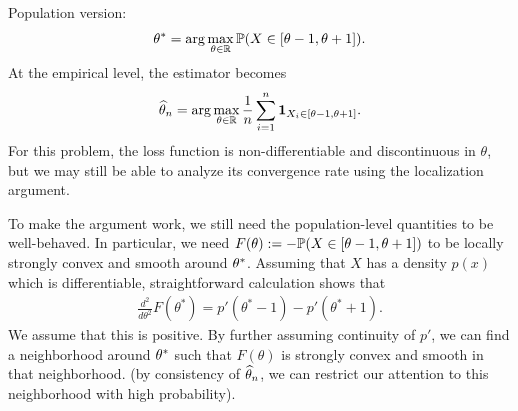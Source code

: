 \documentclass[11pt,letterpaper]{article}
\numberwithin{theorem}{lecture}
\numberwithin{proposition}{lecture}
\numberwithin{lemma}{lecture}
\numberwithin{claim}{lecture}
\numberwithin{corollary}{lecture}
\numberwithin{definition}{lecture}
\numberwithin{conjecture}{lecture}
\numberwithin{remark}{lecture}
\numberwithin{example}{lecture}
\numberwithin{equation}{lecture}
\begin{document}
Population version:
\begin{align*}
  {\theta^*} = \arg\max_{\theta \in \mathbb{R}} {\mathbb{P}} (X \in [\theta - 1, \theta + 1]).
\end{align*}
At the empirical level, the estimator becomes
\begin{align*}
  \widehat{\theta}_n = \arg\max_{\theta \in \mathbb{R}} \frac{1}{n} \sum_{i = 1}^n \bm{1}_{X_i \in [\theta - 1, \theta + 1]}.
\end{align*}
For this problem, the loss function is non-differentiable and discontinuous in $\theta$, but we may still be able to analyze its convergence rate using the localization argument.

To make the argument work, we still need the population-level quantities to be well-behaved. In particular, we need $F(\theta) := - {\mathbb{P}} (X \in [\theta - 1, \theta + 1])$ to be locally strongly convex and smooth around ${\theta^*}$. Assuming that $X$ has a density $p(x)$ which is differentiable, straightforward calculation shows that
\begin{align*}
  \frac{d^2}{d \theta^2} F(\theta^*) = p' (\theta^* - 1) - p' (\theta^* + 1).
\end{align*}
We assume that this is positive. By further assuming continuity of $p'$, we can find a neighborhood around ${\theta^*}$ such that $F(\theta)$ is strongly convex and smooth in that neighborhood. (by consistency of $\widehat{\theta}_n$, we can restrict our attention to this neighborhood with high probability).
\end{document}
